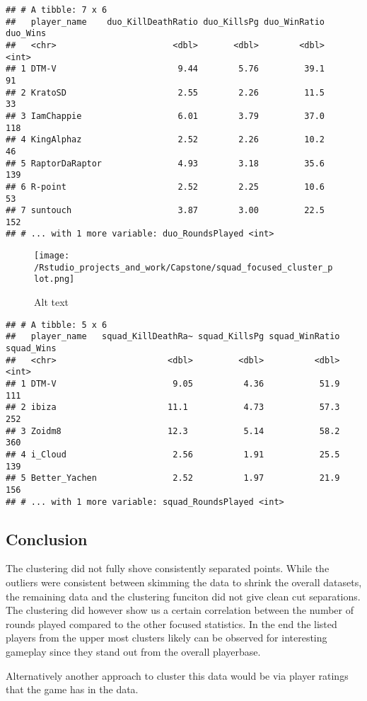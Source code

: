 \documentclass[]{article}
\begin{document}
\begin{verbatim}
## # A tibble: 7 x 6
##   player_name    duo_KillDeathRatio duo_KillsPg duo_WinRatio duo_Wins
##   <chr>                       <dbl>       <dbl>        <dbl>    <int>
## 1 DTM-V                        9.44        5.76         39.1       91
## 2 KratoSD                      2.55        2.26         11.5       33
## 3 IamChappie                   6.01        3.79         37.0      118
## 4 KingAlphaz                   2.52        2.26         10.2       46
## 5 RaptorDaRaptor               4.93        3.18         35.6      139
## 6 R-point                      2.52        2.25         10.6       53
## 7 suntouch                     3.87        3.00         22.5      152
## # ... with 1 more variable: duo_RoundsPlayed <int>
\end{verbatim}

\begin{figure}
\centering
\texttt{[image: /Rstudio\_projects\_and\_work/Capstone/squad\_focused\_cluster\_plot.png]}
\caption{Alt text}
\end{figure}

\begin{verbatim}
## # A tibble: 5 x 6
##   player_name   squad_KillDeathRa~ squad_KillsPg squad_WinRatio squad_Wins
##   <chr>                      <dbl>         <dbl>          <dbl>      <int>
## 1 DTM-V                       9.05          4.36           51.9        111
## 2 ibiza                      11.1           4.73           57.3        252
## 3 Zoidm8                     12.3           5.14           58.2        360
## 4 i_Cloud                     2.56          1.91           25.5        139
## 5 Better_Yachen               2.52          1.97           21.9        156
## # ... with 1 more variable: squad_RoundsPlayed <int>
\end{verbatim}

\subsection{Conclusion}\label{conclusion}

The clustering did not fully shove consistently separated points. While
the outliers were consistent between skimming the data to shrink the
overall datasets, the remaining data and the clustering funciton did not
give clean cut separations. The clustering did however show us a certain
correlation between the number of rounds played compared to the other
focused statistics. In the end the listed players from the upper most
clusters likely can be observed for interesting gameplay since they
stand out from the overall playerbase.

Alternatively another approach to cluster this data would be via player
ratings that the game has in the data.
\end{document}
